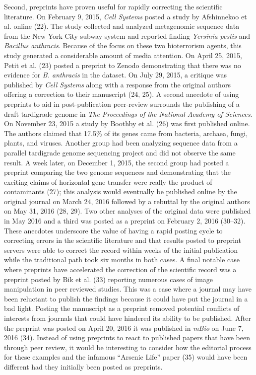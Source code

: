 \documentclass[11pt,]{article}
\begin{document}
Second, preprints have proven useful for rapidly correcting the
scientific literature. On February 9, 2015, \emph{Cell Systems} posted a
study by Afshinnekoo et al. online (22). The study collected and
analyzed metagenomic sequence data from the New York City subway system
and reported finding \emph{Yersinia pestis} and \emph{Bacillus
anthracis}. Because of the focus on these two bioterrorism agents, this
study generated a considerable amount of media attention. On April 25,
2015, Petit et al. (23) posted a preprint to Zenodo demonstrating that
there was no evidence for \emph{B. anthracis} in the dataset. On July
29, 2015, a critique was published by \emph{Cell Systems} along with a
response from the original authors offering a correction to their
manuscript (24, 25). A second anecdote of using preprints to aid in
post-publication peer-review surrounds the publishing of a draft
tardigrade genome in \emph{The Proceedings of the National Academy of
Sciences}. On November 23, 2015 a study by Boothby et al. (26) was first
published online. The authors claimed that 17.5\% of its genes came from
bacteria, archaea, fungi, plants, and viruses. Another group had been
analyzing sequence data from a parallel tardigrade genome sequencing
project and did not observe the same result. A week later, on December
1, 2015, the second group had posted a preprint comparing the two genome
sequences and demonstrating that the exciting claims of horizontal gene
transfer were really the product of contaminants (27); this analysis
would eventually be published online by the original journal on March
24, 2016 followed by a rebuttal by the original authors on May 31, 2016
(28, 29). Two other analyses of the original data were published in May
2016 and a third was posted as a preprint on February 2, 2016 (30--32).
These anecdotes underscore the value of having a rapid posting cycle to
correcting errors in the scientific literature and that results posted
to preprint servers were able to correct the record within weeks of the
initial publication while the traditional path took six months in both
cases. A final notable case where preprints have accelerated the
correction of the scientific record was a preprint posted by Bik et al.
(33) reporting numerous cases of image manipulation in peer reviewed
studies. This was a case where a journal may have been reluctant to
publish the findings because it could have put the journal in a bad
light. Posting the manuscript as a preprint removed potential conflicts
of interests from journals that could have hindered its ability to be
published. After the preprint was posted on April 20, 2016 it was
published in \emph{mBio} on June 7, 2016 (34). Instead of using
preprints to react to published papers that have been through peer
review, it would be interesting to consider how the editorial process
for these examples and the infamous ``Arsenic Life'' paper (35) would
have been different had they initially been posted as preprints.
\end{document}

